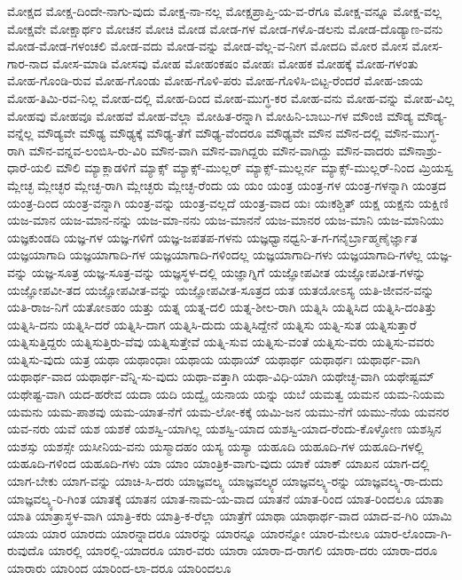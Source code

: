 {ಮೋಕ್ಷದ
ಮೋಕ್ಷ-ದಿಂದೇ-ನಾಗು-ವುದು
ಮೋಕ್ಷ-ನಾ-ನಲ್ಲ
ಮೋಕ್ಷಪ್ರಾಪ್ತಿ-ಯ-ವ-ರೆಗೂ
ಮೋಕ್ಷ-ವನ್ನೂ
ಮೋಕ್ಷ-ವಲ್ಲ
ಮೋಕ್ಷವೇ
ಮೋಕ್ಷಾರ್ಥಂ
ಮೋಚನ
ಮೋಚಿ
ಮೋಡ
ಮೋಡ-ಗಳ
ಮೋಡ-ಗಳೊ-ಡಲನು
ಮೋಡ-ದೊಡ್ಯಾಣ-ವನು
ಮೋಡ-ಮೋಡ-ಗಳಂಚಲಿ
ಮೋಡ-ವದು
ಮೋಡ-ವನ್ನು
ಮೋಡ-ವೆಲ್ಲ-ವ-ನೀಗ
ಮೋದದಿ
ಮೋರ
ಮೋಸ
ಮೋಸ-ಗಾರ-ನಾದ
ಮೋಸ-ಮಾಡಿ
ಮೋಸವು
ಮೋಹ
ಮೋಹಂಕಷಂ
ಮೋಹಃ
ಮೋಹಕ
ಮೋಹಕ್ಕೆ
ಮೋಹ-ಗಳಂತು
ಮೋಹ-ಗೊಂಡಿ-ರುವ
ಮೋಹ-ಗೊಂಡು
ಮೋಹ-ಗೊಳಿ-ಪರು
ಮೋಹ-ಗೊಳಿಸಿ-ಬಿಟ್ಟ-ರೆಂದರೆ
ಮೋಹ-ಜಾಯ
ಮೋಹ-ತಿಮಿ-ರವ-ನಿಲ್ಲ
ಮೋಹ-ದಲ್ಲಿ
ಮೋಹ-ದಿಂದ
ಮೋಹ-ಮುಗ್ಧ-ಕರ
ಮೋಹ-ವನು
ಮೋಹ-ವನ್ನು
ಮೋಹ-ವಿಲ್ಲ
ಮೋಹವು
ಮೋಹವೂ
ಮೋಹವೆ
ಮೋಹ-ವೆಲ್ಲಾ
ಮೋಹಿತ-ರನ್ನಾಗಿ
ಮೋಹಿನಿ-ಬಾಬು-ಗಳ
ಮೌಂಜಿ
ಮೌಡ್ಯ
ಮೌಡ್ಯ-ವನ್ನೆಲ್ಲ
ಮೌಡ್ಯವೇ
ಮೌಢ್ಯ
ಮೌಢ್ಯಕ್ಕೆ
ಮೌಢ್ಯ-ತೆಗೆ
ಮೌಢ್ಯ-ವೆಂದರೂ
ಮೌಢ್ಯವೇ
ಮೌನ
ಮೌನ-ದಲ್ಲಿ
ಮೌನ-ಮುಗ್ಧ-ರಾಗಿ
ಮೌನ-ವನ್ನವ-ಲಂಬಿಸಿ-ರು-ವಿರಿ
ಮೌನ-ವಾಗಿ
ಮೌನ-ವಾಗಿದ್ದರು
ಮೌನ-ವಾಗಿದ್ದು
ಮೌನ-ವಾದರು
ಮೌನಾಶ್ರು-ಧಾರೆ-ಯಲಿ
ಮೌಲಿ
ಮ್ಯಾಕ್ಲಾಡಳಿಗೆ
ಮ್ಯಾಕ್ಸ್
ಮ್ಯಾಕ್ಸ್-ಮುಲ್ಲರ್
ಮ್ಯಾಕ್ಸ್-ಮುಲ್ಲರ್ನ
ಮ್ಯಾಕ್ಸ್-ಮುಲ್ಲರ್-ನಿಂದ
ಮ್ರಿಯಸ್ವ
ಮ್ಲೇಚ್ಛ
ಮ್ಲೇಚ್ಛರ
ಮ್ಲೇಚ್ಛ-ರಾಗಿ
ಮ್ಲೇಚ್ಛರು
ಮ್ಲೇಚ್ಛ-ರೆಂದು
ಯ
ಯಂ
ಯಂತ್ರ
ಯಂತ್ರ-ಗಳ
ಯಂತ್ರ-ಗಳನ್ನಾಗಿ
ಯಂತ್ರದ
ಯಂತ್ರ-ದಿಂದ
ಯಂತ್ರ-ವನ್ನಾಗಿ
ಯಂತ್ರ-ವನ್ನು
ಯಂತ್ರ-ವಲ್ಲದೆ
ಯಂತ್ರ-ವಾದ
ಯಃ
ಯಃಕಶ್ಚಿತ್
ಯಕ್ಷ
ಯಕ್ಷನು
ಯಕ್ಷಿಣಿ
ಯಜ-ಮಾನ
ಯಜ-ಮಾನ-ನನ್ನು
ಯಜ-ಮಾ-ನನು
ಯಜ-ಮಾನನೆ
ಯಜ-ಮಾನರ
ಯಜ-ಮಾನಿ
ಯಜ-ಮಾನಿಯು
ಯಜ್ಞಕುಂಡದಿ
ಯಜ್ಞ-ಗಳ
ಯಜ್ಞ-ಗಳಿಗೆ
ಯಜ್ಞ-ಜಪತಪ-ಗಳನು
ಯಜ್ಞಧ್ವಾನಧ್ವನಿ-ತ-ಗ-ಗನೈರ್ಬ್ರಾಹ್ಮಣೈರ್ಜ್ಞಾತ
ಯಜ್ಞಯಾಗಾದಿ
ಯಜ್ಞಯಾಗಾದಿ-ಗಳ
ಯಜ್ಞಯಾಗಾದಿ-ಗಳಿಂದಲ್ಲ
ಯಜ್ಞಯಾಗಾದಿ-ಗಳು
ಯಜ್ಞಯಾಗಾದಿ-ಗಳೆಲ್ಲ
ಯಜ್ಞ-ವನ್ನು
ಯಜ್ಞ-ಸೂತ್ರ
ಯಜ್ಞ-ಸೂತ್ರ-ವನ್ನು
ಯಜ್ಞಸ್ಥಳ-ದಲ್ಲಿ
ಯಜ್ಞಾಗ್ನಿಗೆ
ಯಜ್ಞೋಪವೀತ
ಯಜ್ಞೋಪವೀತ-ಗಳನ್ನು
ಯಜ್ಞೋಪವೀ-ತದ
ಯಜ್ಞೋಪವೀತ-ವನ್ನು
ಯಜ್ಞೋಪವೀತ-ಸೂತ್ರದ
ಯತ
ಯತಯೋಽಸ್ಯ
ಯತಿ-ಜೀವನ-ವನ್ನು
ಯತಿ-ರಾಜ-ನಿಗೆ
ಯತೋಽಹಂ
ಯತ್ತು
ಯತ್ನ
ಯತ್ನ-ದಲಿ
ಯತ್ನ-ಶೀಲ-ರಾಗಿ
ಯತ್ನಿಸಿ
ಯತ್ನಿಸಿದ
ಯತ್ನಿಸಿ-ದಂತಿತ್ತು
ಯತ್ನಿಸಿ-ದನು
ಯತ್ನಿಸಿ-ದರೆ
ಯತ್ನಿಸಿ-ದಾಗ
ಯತ್ನಿಸಿ-ದುದು
ಯತ್ನಿಸಿದ್ದೇನೆ
ಯತ್ನಿಸು
ಯತ್ನಿ-ಸುತ
ಯತ್ನಿಸುತ್ತಾರೆ
ಯತ್ನಿಸುತ್ತಿದ್ದರು
ಯತ್ನಿಸುತ್ತಿರು-ವೆವು
ಯತ್ನಿಸುತ್ತೇವೆ
ಯತ್ನಿ-ಸುವ
ಯತ್ನಿಸು-ವಂತೆ
ಯತ್ನಿಸು-ವರು
ಯತ್ನಿಸು-ವವರು
ಯತ್ನಿಸು-ವುದು
ಯತ್ರ
ಯಥಾ
ಯಥಾಂಧಾಃ
ಯಥಾಯ
ಯಥಾಯ್
ಯಥಾರ್ಥ
ಯಥಾರ್ಥಃ
ಯಥಾರ್ಥ-ವಾಗಿ
ಯಥಾರ್ಥ-ವಾದ
ಯಥಾರ್ಥ-ವೆನ್ನಿ-ಸು-ವುದು
ಯಥಾ-ವತ್ತಾಗಿ
ಯಥಾ-ವಿಧಿ-ಯಾಗಿ
ಯಥೇಚ್ಛ-ವಾಗಿ
ಯಥೇಷ್ಟಮ್
ಯಥೇಷ್ಟ-ವಾಗಿ
ಯದ-ಹರೇವ
ಯದಾ
ಯದಿ
ಯದ್ವೈ
ಯನಾಯ
ಯನ್ನು
ಯಬೆ
ಯಮತ್ವ
ಯಮನ
ಯಮ-ನಿಯಮ
ಯಮನು
ಯಮ-ಪಾಶವು
ಯಮ-ಯಾತ-ನೆಗೆ
ಯಮ-ಲೋ-ಕಕ್ಕೆ
ಯಮಿ-ಜನ
ಯಮು-ನೆಗೆ
ಯಮು-ನೆಯ
ಯವನರ
ಯವ-ನರು
ಯವೆ
ಯಶ
ಯಶಕೆ
ಯಶಸ್ವಿ-ಯಾಗಿಲ್ಲ
ಯಶಸ್ವಿ-ಯಾದ
ಯಶಸ್ವಿ-ಯಾದ-ರೆಂದು-ಕೊಳ್ಳೋಣ
ಯಶಸ್ಸಿನ
ಯಶಸ್ಸು
ಯಶಸ್ಸೇ
ಯಸೀನಿಯ-ವನು
ಯಸ್ಮಾದಹಂ
ಯಸ್ಯ
ಯಸ್ಯಾ
ಯಹೂದಿ
ಯಹೂದಿ-ಗಳ
ಯಹೂದಿ-ಗಳಲ್ಲಿ
ಯಹೂದಿ-ಗಳಿಂದ
ಯಹೂದಿ-ಗಳು
ಯಾ
ಯಾಂ
ಯಾಂತ್ರಿಕ-ವಾಗು-ವುದು
ಯಾಕೆ
ಯಾಕ್
ಯಾಖನ
ಯಾಗ-ದಲ್ಲಿ
ಯಾಗ-ಬೇಕು
ಯಾಗ-ವನ್ನು
ಯಾಚಿ-ಸಿ-ದರು
ಯಾಜ್ಞವಲ್ಕ್ಯ
ಯಾಜ್ಞವಲ್ಕ್ಯರ
ಯಾಜ್ಞವಲ್ಕ್ಯ-ರನ್ನು
ಯಾಜ್ಞವಲ್ಕ್ಯ-ರಾ-ದುದು
ಯಾಜ್ಞವಲ್ಕ್ಯ-ರಿ-ಗಿಂತ
ಯಾತಕ್ಕೆ
ಯಾತನ
ಯಾತ-ನಾಮ-ಯ-ವಾದ
ಯಾತನೆ
ಯಾತ-ರಿಂದ
ಯಾತ-ರಿಂದಲೂ
ಯಾತಾ
ಯಾತಿ
ಯಾತ್ರಾಸ್ಥಳ-ವಾಗಿ
ಯಾತ್ರಿ-ಕರು
ಯಾತ್ರಿ-ಕ-ರೆಲ್ಲಾ
ಯಾತ್ರೆಗೆ
ಯಾಥಾ
ಯಾಥಾರ್ಥ-ವಾದ
ಯಾದ-ವ-ಗಿರಿ
ಯಾಮಿ
ಯಾಯ
ಯಾರ
ಯಾರದು
ಯಾರನ್ನಾದರೂ
ಯಾರನ್ನು
ಯಾರನ್ನೂ
ಯಾರನ್ನೋ
ಯಾರ-ಮೇಲೂ
ಯಾರ-ಲೊಂದಾ-ಗಿ-ರುವುದೊ
ಯಾರಲ್ಲಿ
ಯಾರಲ್ಲಿ-ಯಾದರೂ
ಯಾರ-ವರು
ಯಾರಾ
ಯಾರಾ-ದ-ರಾಗಲಿ
ಯಾರಾ-ದರು
ಯಾರಾ-ದರೂ
ಯಾರಾರು
ಯಾರಿಂದ
ಯಾರಿಂದ-ಲಾ-ದರೂ
ಯಾರಿಂದಲೂ
}
